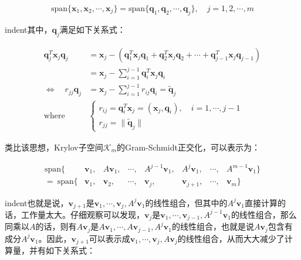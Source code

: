 \documentclass[UTF8,nofonts]{ctexart}
\begin{document}
\[
\text{span}\{\boldsymbol{x}_1,\boldsymbol{x}_2,\cdots,\boldsymbol{x}_j\}=\text{span}\{\boldsymbol{q}_1,\boldsymbol{q}_2,\cdots,\boldsymbol{q}_j\},\quad j=1,2,\cdots,m
\]

indent其中，$\boldsymbol{q}_j$满足如下关系式：

\begin{align*}
\boldsymbol{q}_j^T\boldsymbol{x}_j\boldsymbol{q}_j&=\boldsymbol{x}_j-\left(\boldsymbol{q}_1^T\boldsymbol{x}_j\boldsymbol{q}_1+\boldsymbol{q}_2^T\boldsymbol{x}_j\boldsymbol{q}_2+\cdots+\boldsymbol{q}_{j-1}^T\boldsymbol{x}_j\boldsymbol{q}_{j-1}\right) \\
&=\boldsymbol{x}_j-\sum_{i=1}^{j-1}\boldsymbol{q}_i^T\boldsymbol{x}_j\boldsymbol{q}_i\\
\Longleftrightarrow\quad r_{jj}\boldsymbol{q}_j&=\boldsymbol{x}_j-\sum_{i=1}^{j-1}r_{ij}\boldsymbol{q}_i=\tilde{\boldsymbol{q}}_j \\
\text{where }&
\begin{cases}
r_{ij}=\boldsymbol{q}_i^T\boldsymbol{x}_j=(\boldsymbol{x}_j,\boldsymbol{q}_i),\quad i=1,\cdots,j-1 \\
r_{jj}=\|\tilde{\boldsymbol{q}}_j\|
\end{cases}
\end{align*}

类比该思想，Krylov子空间$\mathcal{K}_m$的Gram-Schmidt正交化，可以表示为：

\[
\begin{array}{rrrrrrrr}
\text{span}\{ & \boldsymbol{v}_1, & A\boldsymbol{v}_1, & \cdots, & A^{j-1}\boldsymbol{v}_1, & A^j\boldsymbol{v}_1, & \cdots, & A^{m-1}\boldsymbol{v}_1\} \\
=\:\text{span}\{ & \boldsymbol{v}_1, & \boldsymbol{v}_2, & \cdots, & \boldsymbol{v}_j, & \boldsymbol{v}_{j+1}, & \cdots, & \boldsymbol{v}_m\}
\end{array}
\]

indent也就是说，$\boldsymbol{v}_{j+1}$是$\boldsymbol{v}_1,\cdots,\boldsymbol{v}_j,A^j\boldsymbol{v}_1$的线性组合，但其中的$A^j\boldsymbol{v}_1$直接计算的话，工作量太大。仔细观察可以发现，$\boldsymbol{v}_j$是$\boldsymbol{v}_1,\cdots,\boldsymbol{v}_{j-1},A^{j-1}\boldsymbol{v}_1$的线性组合，那么同乘以$A$的话，则有$A\boldsymbol{v}_j$是$A\boldsymbol{v}_1,\cdots,A\boldsymbol{v}_{j-1},A^{j}\boldsymbol{v}_1$的线性组合，也就是说$A\boldsymbol{v}_j$包含有成分$A^j\boldsymbol{v}_1$。因此，$\boldsymbol{v}_{j+1}$可以表示成$\boldsymbol{v}_1,\cdots,\boldsymbol{v}_j,A\boldsymbol{v}_j$的线性组合，从而大大减少了计算量，并有如下关系式：
\end{document}

